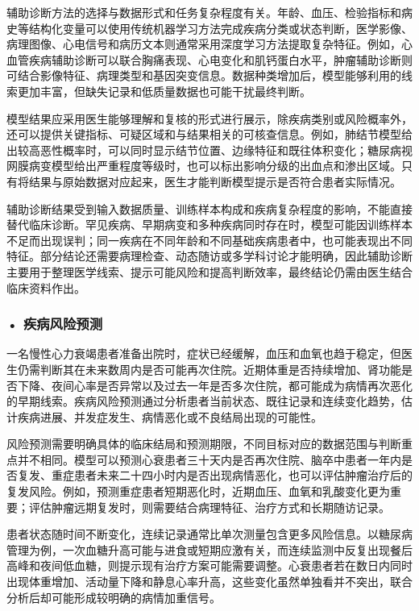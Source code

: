 辅助诊断方法的选择与数据形式和任务复杂程度有关。年龄、血压、检验指标和病史等结构化变量可以使用传统机器学习方法完成疾病分类或状态判断，医学影像、病理图像、心电信号和病历文本则通常采用深度学习方法提取复杂特征。例如，心血管疾病辅助诊断可以联合胸痛表现、心电变化和肌钙蛋白水平，肿瘤辅助诊断则可结合影像特征、病理类型和基因突变信息。数据种类增加后，模型能够利用的线索更加丰富，但缺失记录和低质量数据也可能干扰最终判断。

模型结果应采用医生能够理解和复核的形式进行展示，除疾病类别或风险概率外，还可以提供关键指标、可疑区域和与结果相关的可核查信息。例如，肺结节模型给出较高恶性概率时，可以同时显示结节位置、边缘特征和既往体积变化；糖尿病视网膜病变模型给出严重程度等级时，也可以标出影响分级的出血点和渗出区域。只有将结果与原始数据对应起来，医生才能判断模型提示是否符合患者实际情况。

辅助诊断结果受到输入数据质量、训练样本构成和疾病复杂程度的影响，不能直接替代临床诊断。罕见疾病、早期病变和多种疾病同时存在时，模型可能因训练样本不足而出现误判；同一疾病在不同年龄和不同基础疾病患者中，也可能表现出不同特征。部分结论还需要病理检查、动态随访或多学科讨论才能明确，因此辅助诊断主要用于整理医学线索、提示可能风险和提高判断效率，最终结论仍需由医生结合临床资料作出。

\subsubsection*{\textbf{• 疾病风险预测}}

一名慢性心力衰竭患者准备出院时，症状已经缓解，血压和血氧也趋于稳定，但医生仍需判断其在未来数周内是否可能再次住院。近期体重是否持续增加、肾功能是否下降、夜间心率是否异常以及过去一年是否多次住院，都可能成为病情再次恶化的早期线索。疾病风险预测通过分析患者当前状态、既往记录和连续变化趋势，估计疾病进展、并发症发生、病情恶化或不良结局出现的可能性。

风险预测需要明确具体的临床结局和预测期限，不同目标对应的数据范围与判断重点并不相同。模型可以预测心衰患者三十天内是否再次住院、脑卒中患者一年内是否复发、重症患者未来二十四小时内是否出现病情恶化，也可以评估肿瘤治疗后的复发风险。例如，预测重症患者短期恶化时，近期血压、血氧和乳酸变化更为重要；评估肿瘤远期复发时，则需要结合病理特征、治疗方式和长期随访记录。

患者状态随时间不断变化，连续记录通常比单次测量包含更多风险信息。以糖尿病管理为例，一次血糖升高可能与进食或短期应激有关，而连续监测中反复出现餐后高峰和夜间低血糖，则提示现有治疗方案可能需要调整。心衰患者若在数日内同时出现体重增加、活动量下降和静息心率升高，这些变化虽然单独看并不突出，联合分析后却可能形成较明确的病情加重信号。

